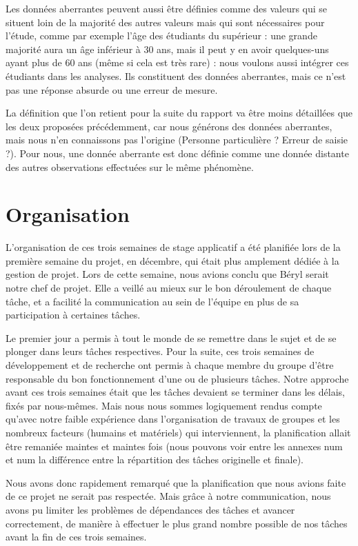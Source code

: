 \documentclass[a4paper,12pt]{article} %
\begin{document}
		    Les données aberrantes peuvent aussi être définies comme des valeurs qui se situent loin de la majorité des autres valeurs mais qui sont nécessaires pour l'étude, comme par exemple l'âge des étudiants du supérieur : une grande majorité aura un âge inférieur à 30 ans, mais il peut y en avoir quelques-uns ayant plus de 60 ans (même si cela est très rare) : nous voulons aussi intégrer ces étudiants dans les analyses. Ils constituent des données aberrantes, mais ce n'est pas une réponse absurde ou une erreur de mesure.
		    
		    La définition que l'on retient pour la suite du rapport va être moins détaillées que les deux proposées précédemment, car nous générons des données aberrantes, mais nous n'en connaissons pas l'origine (Personne particulière ? Erreur de saisie ?). Pour nous, une donnée aberrante est donc définie comme une donnée distante des autres observations effectuées sur le même phénomène.
		    
		    
	\section{Organisation}
	    L'organisation de ces trois semaines de stage applicatif a été planifiée lors de la première semaine du projet, en décembre, qui était plus amplement dédiée à la gestion de projet.
        Lors de cette semaine, nous avions conclu que Béryl serait notre chef de projet. Elle a veillé au mieux sur le bon déroulement de chaque tâche, et a facilité la communication au sein de l'équipe en plus de sa participation à certaines tâches.
    
        Le premier jour a permis à tout le monde de se remettre dans le sujet et de se plonger dans leurs tâches respectives. Pour la suite, ces trois semaines de développement et de recherche ont permis à chaque membre du groupe d'être responsable du bon fonctionnement d'une ou de plusieurs tâches. Notre approche avant ces trois semaines était que les tâches devaient se terminer dans les délais, fixés par nous-mêmes.
        Mais nous nous sommes logiquement rendus compte qu'avec notre faible expérience dans l'organisation de travaux de groupes et les nombreux facteurs (humains et matériels) qui interviennent, la planification allait être remaniée maintes et maintes fois (nous pouvons voir entre les annexes num et num la différence entre la répartition des tâches originelle et finale).
        
        Nous avons donc rapidement remarqué que la planification que nous avions faite de ce projet ne serait pas respectée. Mais grâce à notre communication, nous avons pu limiter les problèmes de dépendances des tâches et avancer correctement, de manière à effectuer le plus grand nombre possible de nos tâches avant la fin de ces trois semaines.\\
        
\end{document}
